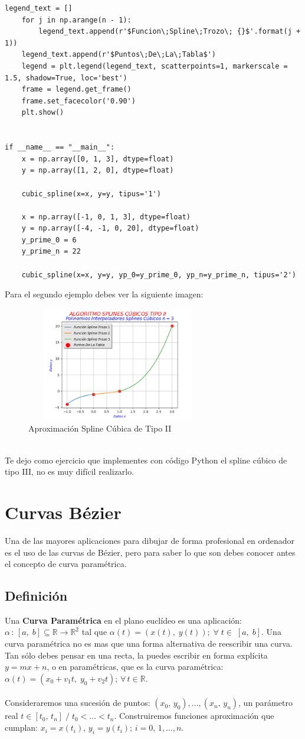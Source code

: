 \documentclass[12pt,a4paper,oneside]{scrbook}
\newcounter{ns}
\begin{document}
\begin{lstlisting}[frame=none]
    legend_text = []
    for j in np.arange(n - 1):
        legend_text.append(r'$Funcion\;Spline\;Trozo\; {}$'.format(j + 1))
    legend_text.append(r'$Puntos\;De\;La\;Tabla$')
    legend = plt.legend(legend_text, scatterpoints=1, markerscale = 1.5, shadow=True, loc='best')
    frame = legend.get_frame()
    frame.set_facecolor('0.90')
    plt.show()


if __name__ == "__main__":
    x = np.array([0, 1, 3], dtype=float)
    y = np.array([1, 2, 0], dtype=float)

    cubic_spline(x=x, y=y, tipus='1')

    x = np.array([-1, 0, 1, 3], dtype=float)
    y = np.array([-4, -1, 0, 20], dtype=float)
    y_prime_0 = 6
    y_prime_n = 22

    cubic_spline(x=x, y=y, yp_0=y_prime_0, yp_n=y_prime_n, tipus='2')
\end{lstlisting}
\newpage
Para el segundo ejemplo debes ver la siguiente imagen:
\begin{figure}[h!]
    \centering
    \includegraphics[width=8cm,height=5cm]{spline.png}
    \caption{Aproximación Spline Cúbica de Tipo II}
    \label{fig:spline}
\end{figure}\\
Te dejo como ejercicio que implementes con código Python el spline cúbico de tipo III, no es muy difícil realizarlo.
\section{Curvas Bézier}
Una de las mayores aplicaciones para dibujar de forma profesional en ordenador es el uso de las curvas de Bézier, pero para saber lo que son debes conocer antes el concepto de curva paramétrica.
\subsection*{Definición}
Una \textbf{Curva Paramétrica} en el plano euclídeo es una aplicación: $\alpha\,:\,[a,\;b]\subseteq\mathbb{R}\longrightarrow \mathbb{R}^2$ tal que $\alpha (t)=(x(t),\; y(t));\;\forall\; t\in\;[a,\; b]$. Una curva paramétrica no es mas que una forma alternativa de reescribir una curva. Tan sólo debes pensar en una recta, la puedes escribir en forma explícita $y=mx+n$, o en paramétricas, que es la curva paramétrica: $\alpha (t)=(x_0+v_1t,\;y_0+v_2t);\,\forall\,t\in\mathbb{R}$.\\ \\
Consideraremos una sucesión de puntos: $(x_0,\,y_0),\dots ,(x_n,\,y_n)$, un parámetro real $t\in [t_0,\,t_n]\;/\;t_0<\dots <t_n$. Construiremos funciones aproximación que cumplan: $x_i=x(t_i),\,y_i=y(t_i);\,i=0,\,1,\dots ,n$.\newpage
\end{document}
